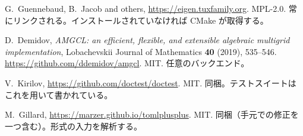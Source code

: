\begin{description}[leftmargin=0pt, labelsep=0.5em, style=unboxed]
  \item[Eigen.] G.~Guennebaud, B.~Jacob and others,
    \url{https://eigen.tuxfamily.org}. MPL-2.0. 常にリンクされる。インストールされていなければ
    CMake が取得する。

  \item[AMGCL.] D.~Demidov, \emph{AMGCL: an efficient, flexible, and extensible
    algebraic multigrid implementation}, Lobachevskii Journal of Mathematics
    \textbf{40} (2019), 535--546. \url{https://github.com/ddemidov/amgcl}.
    MIT. 任意のバックエンド。

  \item[doctest.] V.~Kirilov, \url{https://github.com/doctest/doctest}. MIT.
    同梱。テストスイートはこれを用いて書かれている。

  \item[toml++.] M.~Gillard, \url{https://marzer.github.io/tomlplusplus}. MIT.
    同梱（手元での修正を一つ含む）。形式の入力を解析する。
\end{description}

